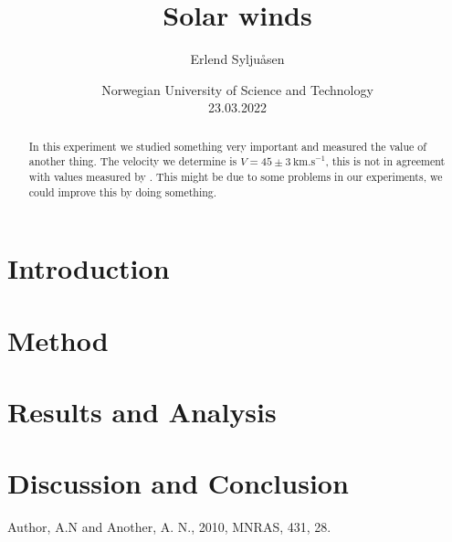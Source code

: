 \documentclass[article,11pt]{article}
\begin{document}
\title{Solar winds}
\author{Erlend Syljuåsen}
\date{Norwegian University of Science and Technology\\23.03.2022}
\maketitle

\begin{abstract}
In this experiment we studied something very important and measured the value of another thing. The velocity we determine is $V=45 \pm 3\ \mathrm{km.s}^{-1}$, this is not in agreement with values measured by \cite{Author2010}. This might be due to some problems in our experiments, we could improve this by doing something.
\end{abstract}


\section{Introduction}
\section{Method}

\section{Results and Analysis}

\section{Discussion and Conclusion}
\begin{thebibliography}{99}

Author, A.N and Another, A. N., 2010, MNRAS, 431, 28.

\end{thebibliography}
\end{document}
